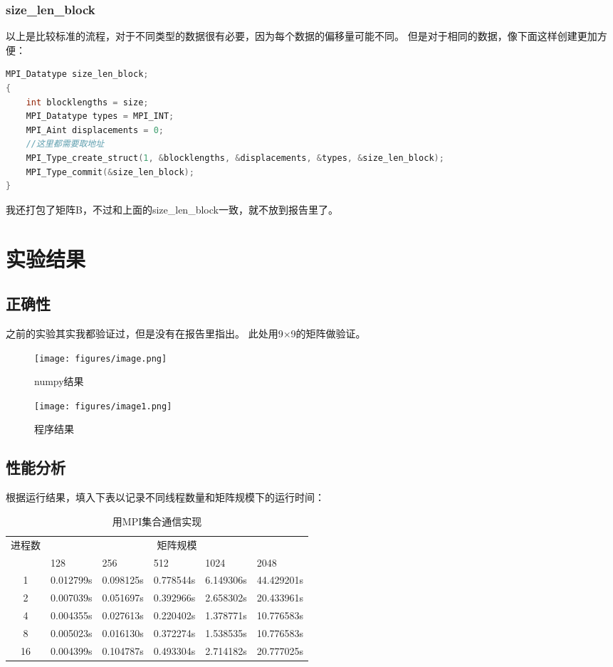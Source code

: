 \documentclass{SYSUReport}
\begin{document}
\subsubsection{size\_len\_block}
以上是比较标准的流程，对于不同类型的数据很有必要，因为每个数据的偏移量可能不同。
但是对于相同的数据，像下面这样创建更加方便：
\begin{lstlisting}[language=c++]
MPI_Datatype size_len_block;
{
    int blocklengths = size;
    MPI_Datatype types = MPI_INT;
    MPI_Aint displacements = 0;
    //这里都需要取地址
    MPI_Type_create_struct(1, &blocklengths, &displacements, &types, &size_len_block);
    MPI_Type_commit(&size_len_block);
}
\end{lstlisting}

我还打包了矩阵B，不过和上面的size\_len\_block一致，就不放到报告里了。

\section{实验结果}
\subsection{正确性}
之前的实验其实我都验证过，但是没有在报告里指出。
此处用9×9的矩阵做验证。
\begin{figure}[htbp]
    \centering
    \texttt{[image: figures/image.png]}
    \caption{numpy结果}
    \label{fig:example}
\end{figure}
\begin{figure}[htbp]
    \centering
    \texttt{[image: figures/image1.png]}
    \caption{程序结果}
    \label{fig:example1}
\end{figure}
\subsection{性能分析}
根据运行结果，填入下表以记录不同线程数量和矩阵规模下的运行时间：
\begin{table}[htbp]
    \centering
    \caption{用MPI集合通信实现}
    \label{表1}
    \begin{tabular}{|c|l|l|l|l|l|}
        \hline
        \multirow{2}{*}{进程数} & \multicolumn{5}{c|}{矩阵规模} \\ \cline{2-6} 
        & 128 & 256 & 512 & 1024 & 2048 \\ \hline
        1 &0.012799s&0.098125s& 0.778544s&6.149306s&44.429201s\\ \hline
        2 &0.007039s&0.051697s&0.392966s&2.658302s&20.433961s\\ \hline
        4 &0.004355s&0.027613s&0.220402s&1.378771s&10.776583s\\ \hline
        8 &0.005023s&0.016130s&0.372274s&1.538535s&10.776583s\\ \hline
        16 &0.004399s&0.104787s&0.493304s&2.714182s&20.777025s\\ \hline
    \end{tabular}
\end{table}
\end{document}
